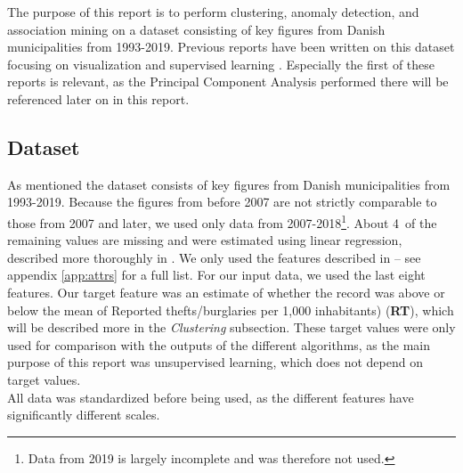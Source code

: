 The purpose of this report is to perform clustering, anomaly detection, and association mining on a dataset consisting of key figures from Danish municipalities from 1993-2019.
Previous reports have been written on this dataset focusing on visualization \cite{skynet1} and supervised learning \cite{skynet2}.
Especially the first of these reports is relevant, as the Principal Component Analysis performed there will be referenced later on in this report.

\subsection{Dataset}
As mentioned the dataset consists of key figures from Danish municipalities from 1993-2019.
Because the figures from before 2007 are not strictly comparable to those from 2007 and later, we used only data from 2007-2018\footnote{Data from 2019 is largely incomplete and was therefore not used.}.
About 4\pro\ of the remaining values are missing and were estimated using linear regression, described more thoroughly in \cite{skynet2}.
We only used the features described in \cite{skynet1} -- see appendix \ref{app:attrs} for a full list.
For our input data, we used the last eight features.
Our target feature was an estimate of whether the record was above or below the mean of Reported thefts/burglaries per 1,000 inhabitants) (\textbf{RT}), which will be described more in the \textit{Clustering} subsection. These target values were only used for comparison with the outputs of the different algorithms, as the main purpose of this report was unsupervised learning, which does not depend on target values.
\\
All data was standardized before being used, as the different features have significantly different scales.

